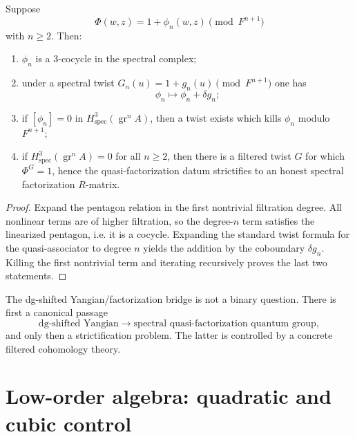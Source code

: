 \begin{theorem}
\ClaimStatusProvedHere
\label{thm:strictification-spectral-cohomology}
Suppose
\[
\Phi(w,z)=1+\phi_n(w,z)\pmod{F^{n+1}}
\]
with $n\ge 2$.  Then:
\begin{enumerate}
\item $\phi_n$ is a $3$-cocycle in the spectral complex;
\item under a spectral twist $G_n(u)=1+g_n(u)\pmod{F^{n+1}}$ one has
  \[
  \phi_n\longmapsto \phi_n+\delta g_n;
  \]
\item if $[\phi_n]=0$ in
  $H^3_{\mathrm{spec}}(\operatorname{gr}^nA)$, then a twist exists which
  kills $\phi_n$ modulo $F^{n+1}$;
\item if $H^3_{\mathrm{spec}}(\operatorname{gr}^nA)=0$ for all $n\ge 2$,
  then there is a filtered twist $G$ for which $\Phi^G=1$, hence the
  quasi-factorization datum strictifies to an honest spectral
  factorization $R$-matrix.
\end{enumerate}
\end{theorem}

\begin{proof}
Expand the pentagon relation in the first nontrivial filtration degree.
All nonlinear terms are of higher filtration, so the degree-$n$ term
satisfies the linearized pentagon, i.e. it is a cocycle.  Expanding the
standard twist formula for the quasi-associator to degree $n$ yields the
addition by the coboundary $\delta g_n$.  Killing the first nontrivial
term and iterating recursively proves the last two statements.
\end{proof}

\begin{conclusion}
The dg-shifted Yangian/factorization bridge is not a binary question.
There is first a canonical passage
\[
\text{dg-shifted Yangian}
\longrightarrow
\text{spectral quasi-factorization quantum group},
\]
and only then a strictification problem.  The latter is controlled by a
concrete filtered cohomology theory.
\end{conclusion}

\section{Low-order algebra: quadratic and cubic control}

